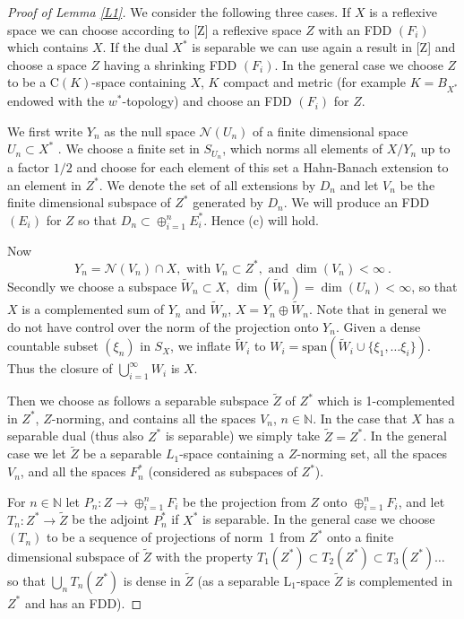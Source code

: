 \documentclass[11pt,leqno]{amsart}
\theoremstyle{definition}
\newcommand{\cN}{\mathcal{N}}
\newcommand{\N}{\mathbb{N}}
\begin{document}
\begin{proof}[Proof of Lemma \ref{L1}]
We consider the following three cases.
If $X$ is a reflexive space we can choose according to [Z] a reflexive space
$Z$ with an FDD  $(F_i)$ which contains $X$.
If the dual $X^*$ is separable we can use again a result in [Z]  and
choose a space $Z$ having a shrinking FDD $(F_i)$.
In the general case we choose $Z$ to be a C$(K)$-space  containing $X$,
$K$ compact and metric 
(for example $K=B_{X^*}$ endowed with the $w^*$-topology) and choose
an FDD $(F_i)$ for $Z$.
  
We first write $Y_n$ as the null space $\cN(U_n)$ of a finite dimensional
space $U_n\subset X^*$ . 
We choose a finite set in $S_{U_n}$, which norms all elements of
$X/Y_n$ up to a factor $1/2$ and  choose for each element of this
set a Hahn-Banach extension to an element  in $Z^*$. 
We denote the set of all extensions by  $D_n$ and 
let $V_n$ be the finite dimensional
subspace of $Z^*$ generated by $D_n$.  
We will produce an FDD $(E_i)$ for $Z$ so that 
$D_n\subset \oplus_{i=1}^n E_i^*$. 
Hence (c) will hold. 
     
Now   
\begin{equation}\label{E5}
Y_n=\cN(V_n)\cap X, \text{ with }V_n\subset Z^*,\text{ and }\dim(V_n)<\infty\ .
\end{equation}
Secondly we choose a subspace  $\tilde W_n\subset X$, 
$\dim(\tilde W_n)=\dim(U_n)<\infty$,
so that $X$ is a complemented sum of $Y_n$ and $\tilde W_n$, 
$X= Y_n \oplus \tilde W_n$. 
Note that in general we do not have  control over the norm 
of the projection onto $Y_n$.  
Given a dense countable subset $(\xi_n)$ in $S_X$, we inflate
$\tilde W_i$ to $W_i=\text{span}(\tilde W_i \cup \{\xi_1,\ldots\xi_i\})$.
Thus the closure of $\bigcup_{i=1}^\infty W_i$ is $X$.
    
Then we choose as follows a separable subspace $\tilde Z$ of $Z^*$
which is 1-complemented in $Z^*$,  $Z$-norming, and contains
all the spaces $V_n$, $n\in\N$.
In the case that $X$ has a separable dual (thus also $Z^*$
is separable) we simply take $\tilde Z=Z^*$. In the general
case we let $\tilde Z$ be a separable $L_1$-space containing
a $Z$-norming set,  all the spaces $V_n$, and all the spaces $F_n^*$
(considered as subspaces of $Z^*$).  
  
For $n\in\N$ let $P_n: Z\to \oplus_{i=1}^n F_i$ be the projection from $Z$ onto
$\oplus_{i=1}^n F_i$, and let $T_n:Z^*\to \tilde Z$ be 
the adjoint $P^*_n$ if $X^*$ is separable. 
In the general case we choose $(T_n)$ to be a sequence of
projections of norm~1 from $Z^*$ onto a finite dimensional subspace of 
$\tilde Z$ with the property $T_1(Z^*)\subset T_2(Z^*)\subset T_3(Z^*)\ldots$
so that $\bigcup_n T_n(Z^*)$ is dense in $\tilde Z$ (as a separable 
L$_1$-space $\tilde Z$ is complemented in $Z^*$ and  has an FDD).
      

\end{proof}
\end{document}
